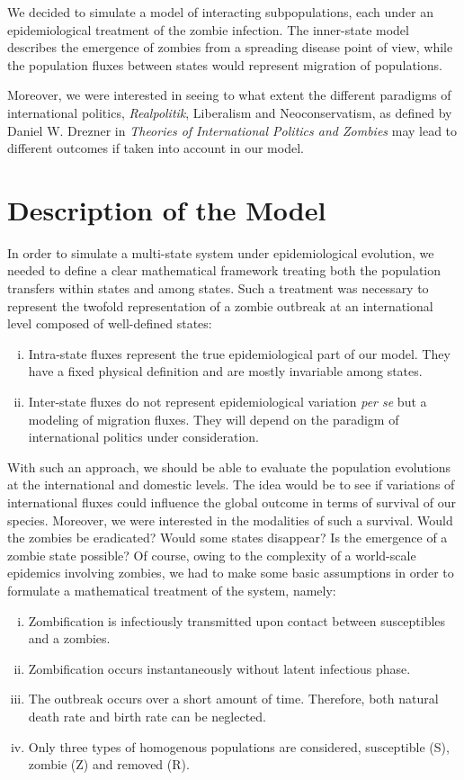 \documentclass[11pt]{article} %
\begin{document}
We decided to simulate a model of interacting subpopulations, each under an epidemiological treatment of the zombie infection. The inner-state model describes the emergence of zombies from a spreading disease point of view, while the population fluxes between states would represent migration of populations. 

Moreover, we were interested in seeing to what extent the different paradigms of international politics, \textit{Realpolitik}, Liberalism and Neoconservatism, as defined by Daniel W. Drezner in \textit{Theories of International Politics and Zombies} \cite{drezner} may lead to different outcomes if taken into account in our model. 

\newpage
\section{Description of the Model}\indent

In order to simulate a multi-state system under epidemiological evolution, we needed to define a clear mathematical framework treating both the population transfers within states and among states. Such a treatment was necessary to represent the twofold representation of a zombie outbreak at an international level composed of well-defined states:
\begin{enumerate}[i.]
	\item Intra-state fluxes represent the true epidemiological part of our model. They have a fixed physical definition and are mostly invariable among states.
	\item Inter-state fluxes do not represent epidemiological variation \textit{per se} but a modeling of migration fluxes. They will depend on the paradigm of international politics under consideration. 
\end{enumerate}

With such an approach, we should be able to evaluate the population evolutions at the international and domestic levels. The idea would be to see if variations of international fluxes could influence the global outcome in terms of survival of our species. Moreover, we were interested in the modalities of such a survival. Would the zombies be eradicated? Would some states disappear? Is the emergence of a zombie state possible? Of course, owing to the complexity of a world-scale epidemics involving zombies, we had to make some basic assumptions in order to formulate a mathematical treatment of the system, namely:
\begin{enumerate}[i.]
	\item Zombification is infectiously transmitted upon contact between susceptibles and a zombies.
	\item Zombification occurs instantaneously without latent infectious phase.
	\item The outbreak occurs over a short amount of time. Therefore, both natural death rate and birth rate can be neglected.
	\item Only three types of homogenous populations are considered, susceptible (S), zombie (Z) and removed (R).
\end{enumerate}
\end{document}
